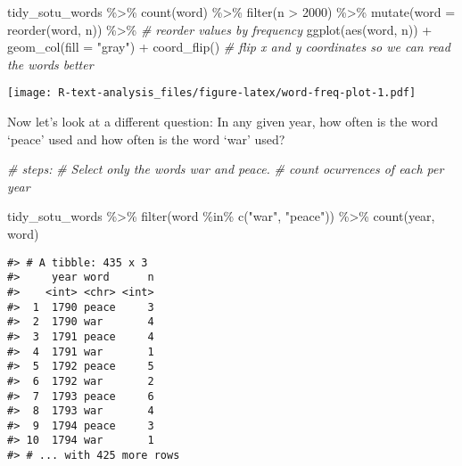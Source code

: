 \documentclass[
]{book}
\newenvironment{Shaded}{\begin{snugshade}}{\end{snugshade}}
\newcommand{\AttributeTok}[1]{\textcolor[rgb]{0.77,0.63,0.00}{#1}}
\newcommand{\CommentTok}[1]{\textcolor[rgb]{0.56,0.35,0.01}{\textit{#1}}}
\newcommand{\DecValTok}[1]{\textcolor[rgb]{0.00,0.00,0.81}{#1}}
\newcommand{\FunctionTok}[1]{\textcolor[rgb]{0.00,0.00,0.00}{#1}}
\newcommand{\NormalTok}[1]{#1}
\newcommand{\SpecialCharTok}[1]{\textcolor[rgb]{0.00,0.00,0.00}{#1}}
\newcommand{\StringTok}[1]{\textcolor[rgb]{0.31,0.60,0.02}{#1}}
\begin{document}
\begin{Shaded}
\begin{Highlighting}[]
\NormalTok{tidy\_sotu\_words }\SpecialCharTok{\%\textgreater{}\%}
  \FunctionTok{count}\NormalTok{(word) }\SpecialCharTok{\%\textgreater{}\%} 
  \FunctionTok{filter}\NormalTok{(n }\SpecialCharTok{\textgreater{}} \DecValTok{2000}\NormalTok{) }\SpecialCharTok{\%\textgreater{}\%} 
  \FunctionTok{mutate}\NormalTok{(}\AttributeTok{word =} \FunctionTok{reorder}\NormalTok{(word, n)) }\SpecialCharTok{\%\textgreater{}\%}  \CommentTok{\# reorder values by frequency}
  \FunctionTok{ggplot}\NormalTok{(}\FunctionTok{aes}\NormalTok{(word, n)) }\SpecialCharTok{+}
     \FunctionTok{geom\_col}\NormalTok{(}\AttributeTok{fill =} \StringTok{"gray"}\NormalTok{) }\SpecialCharTok{+}
     \FunctionTok{coord\_flip}\NormalTok{()  }\CommentTok{\# flip x and y coordinates so we can read the words better}
\end{Highlighting}
\end{Shaded}

\texttt{[image: R-text-analysis\_files/figure-latex/word-freq-plot-1.pdf]}

Now let's look at a different question: In any given year, how often is the word `peace' used and how often is the word `war' used?

\begin{Shaded}
\begin{Highlighting}[]
\CommentTok{\# steps:}
\CommentTok{\# Select only the words \textquotesingle{}war\textquotesingle{} and \textquotesingle{}peace\textquotesingle{}.}
\CommentTok{\# count ocurrences of each per year}

\NormalTok{tidy\_sotu\_words }\SpecialCharTok{\%\textgreater{}\%}
  \FunctionTok{filter}\NormalTok{(word }\SpecialCharTok{\%in\%} \FunctionTok{c}\NormalTok{(}\StringTok{"war"}\NormalTok{, }\StringTok{"peace"}\NormalTok{)) }\SpecialCharTok{\%\textgreater{}\%} 
  \FunctionTok{count}\NormalTok{(year, word)}
\end{Highlighting}
\end{Shaded}

\begin{verbatim}
#> # A tibble: 435 x 3
#>     year word      n
#>    <int> <chr> <int>
#>  1  1790 peace     3
#>  2  1790 war       4
#>  3  1791 peace     4
#>  4  1791 war       1
#>  5  1792 peace     5
#>  6  1792 war       2
#>  7  1793 peace     6
#>  8  1793 war       4
#>  9  1794 peace     3
#> 10  1794 war       1
#> # ... with 425 more rows
\end{verbatim}
\end{document}
